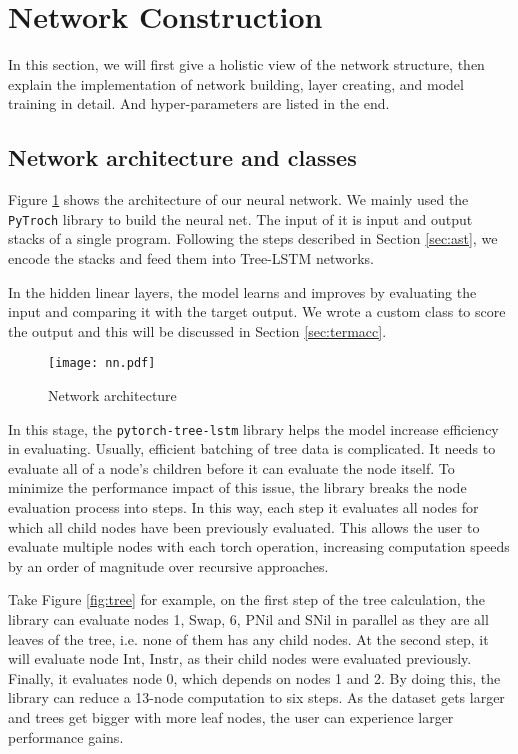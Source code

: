 \section{Network Construction}
\label{sec:network}
In this section, we will first give a holistic view of the network structure, then explain the implementation of network building, layer creating, and model training in detail. And hyper-parameters are listed in the end.

\subsection{Network architecture and classes}
Figure \ref{fig:nn} shows the architecture of our neural network. We mainly used the \texttt{PyTroch} \cite{pytorch} library to build the neural net. The input of it is input and output stacks of a single program. Following the steps described in Section \ref{sec:ast}, we encode the stacks and feed them into Tree-LSTM networks. 

In the hidden linear layers, the model learns and improves by evaluating the input and comparing it with the target output. We wrote a custom class to score the output and this will be discussed in Section \ref{sec:termacc}.  

\begin{figure}[H]
    \centering
    \texttt{[image: nn.pdf]}
    \caption{Network architecture}
    \label{fig:nn}
\end{figure}

In this stage, the \texttt{pytorch-tree-lstm} \cite{pytorch-tree-lstm} library helps the model increase efficiency in evaluating. Usually, efficient batching of tree data is complicated. It needs to evaluate all of a node's children before it can evaluate the node itself. To minimize the performance impact of this issue, the library breaks the node evaluation process into steps. In this way, each step it evaluates all nodes for which all child nodes have been previously evaluated. This allows the user to evaluate multiple nodes with each torch operation, increasing computation speeds by an order of magnitude over recursive approaches.

Take Figure \ref{fig:tree} for example, on the first step of the tree calculation, the library can evaluate nodes 1, Swap, 6, PNil and SNil in parallel as they are all leaves of the tree, i.e. none of them has any child nodes. At the second step, it will evaluate node Int, Instr, as their child nodes were evaluated previously. Finally, it evaluates node 0, which depends on nodes 1 and 2. By doing this, the library can reduce a 13-node computation to six steps. As the dataset gets larger and trees get bigger with more leaf nodes, the user can experience larger performance gains.

